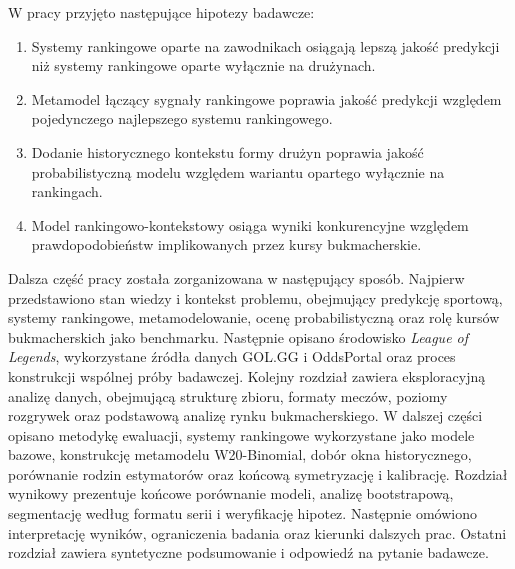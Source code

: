 W pracy przyjęto następujące hipotezy badawcze:

\begin{enumerate}
    \item Systemy rankingowe oparte na zawodnikach osiągają lepszą jakość predykcji niż systemy rankingowe oparte wyłącznie na drużynach.
    \item Metamodel łączący sygnały rankingowe poprawia jakość predykcji względem pojedynczego najlepszego systemu rankingowego.
    \item Dodanie historycznego kontekstu formy drużyn poprawia jakość probabilistyczną modelu względem wariantu opartego wyłącznie na rankingach.
    \item Model rankingowo-kontekstowy osiąga wyniki konkurencyjne względem prawdopodobieństw implikowanych przez kursy bukmacherskie.
\end{enumerate}

Dalsza część pracy została zorganizowana w następujący sposób. Najpierw przedstawiono stan wiedzy i
kontekst problemu, obejmujący predykcję sportową, systemy rankingowe, metamodelowanie, ocenę
probabilistyczną oraz rolę kursów bukmacherskich jako benchmarku. Następnie opisano środowisko
\textit{League of Legends}, wykorzystane źródła danych GOL.GG i OddsPortal oraz proces konstrukcji
wspólnej próby badawczej. Kolejny rozdział zawiera eksploracyjną analizę danych, obejmującą
strukturę zbioru, formaty meczów, poziomy rozgrywek oraz podstawową analizę rynku bukmacherskiego. W
dalszej części opisano metodykę ewaluacji, systemy rankingowe wykorzystane jako modele bazowe,
konstrukcję metamodelu W20-Binomial, dobór okna historycznego, porównanie rodzin estymatorów oraz
końcową symetryzację i kalibrację. Rozdział wynikowy prezentuje końcowe porównanie modeli, analizę
bootstrapową, segmentację według formatu serii i weryfikację hipotez. Następnie omówiono
interpretację wyników, ograniczenia badania oraz kierunki dalszych prac. Ostatni rozdział zawiera
syntetyczne podsumowanie i odpowiedź na pytanie badawcze.
